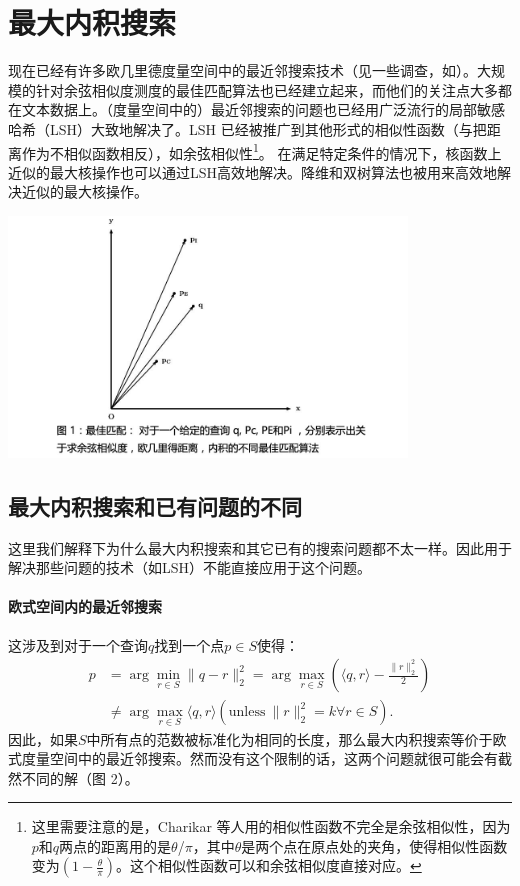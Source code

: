 \documentclass[twocolumn]{article}
\begin{document}
\section{最大内积搜索}
现在已经有许多欧几里德度量空间中的最近邻搜索技术（见一些调查，如\cite{9}）。大规模的针对余弦相似度测度\cite{1}的最佳匹配算法也已经建立起来，而他们的关注点大多都在文本数据上。（度量空间中的）最近邻搜索的问题也已经用广泛流行的局部敏感哈希（LSH）\cite{14,18}大致地解决了。LSH 已经被推广到其他形式的相似性函数（与把距离作为不相似函数相反），如余弦相似性\cite{7}\footnote{这里需要注意的是，Charikar 等人\cite{7}用的相似性函数不完全是余弦相似性，因为$p$和$q$两点的距离用的是$\theta$/$\pi$，其中$\theta$是两个点在原点处的夹角，使得相似性函数变为$\left(1-\frac{\theta}{\pi}\right)$。这个相似性函数可以和余弦相似度直接对应。}。
在满足特定条件的情况下，核函数上近似的最大核操作也可以通过LSH高效地解决。降维\cite{30}和双树算法\cite{20}也被用来高效地解决近似的最大核操作。

\includegraphics[width=300pt,clip,trim=30 0 0 0]{fig01.jpg}

\subsection{最大内积搜索和已有问题的不同}
这里我们解释下为什么最大内积搜索和其它已有的搜索问题都不太一样。因此用于解决那些问题的技术（如LSH）不能直接应用于这个问题。

\paragraph{欧式空间内的最近邻搜索}这涉及到对于一个查询$q$找到一个点$p \in S$使得：
\begin{align*}
p &= \arg \min_{r \in S}\|q - r\|^2_2 = \arg \max_{r \in S}\left(\langle q,r \rangle - \frac{\|r\|_2^2}{2}\right) \\
  &  \neq \arg \max_{r \in S} \langle q,r \rangle (\mathrm{unless}\ \|r\|_2^2 = k \forall r \in S).
\end{align*}
因此，如果$S$中所有点的范数被标准化为相同的长度，那么最大内积搜索等价于欧式度量空间中的最近邻搜索。然而没有这个限制的话，这两个问题就很可能会有截然不同的解（图 2）。
\end{document}

